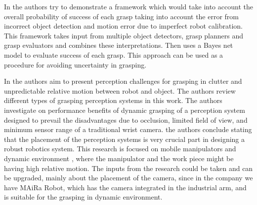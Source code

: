 {In \cite{author19} the authors try to demonstrate a framework which would take into account  the overall probability of success of each grasp taking into account the error from incorrect object detection and motion error due to imperfect robot calibration. This framework takes input from multiple object detectors, grasp planners and grasp evaluators and combines these interpretations. Then uses a Bayes net model to evaluate success of each grasp. This approach can be used as a  procedure for avoiding uncertainty in grasping.

In \cite{author20} the authors aim to present perception challenges for grasping in clutter and unpredictable relative motion between robot and object. The authors review different types of grasping perception systems in this work. The authors investigate on performance benefits of dynamic grasping of a perception system designed to prevail the disadvantages due to occlusion, limited field of view, and minimum sensor range of a traditional wrist camera. the authors conclude stating that the placement of the perception systems is very crucial part in designing a robust robotics system. This research is focused on mobile manipulators and dynamic environment , where the manipulator and the work piece might be having high relative motion. The inputs from the research could be taken and can be upgraded, mainly about the placement of the camera, since in the company we have MAiRa Robot, which has the camera integrated in the industrial arm, and is suitable for the grasping in dynamic environment. 

}
